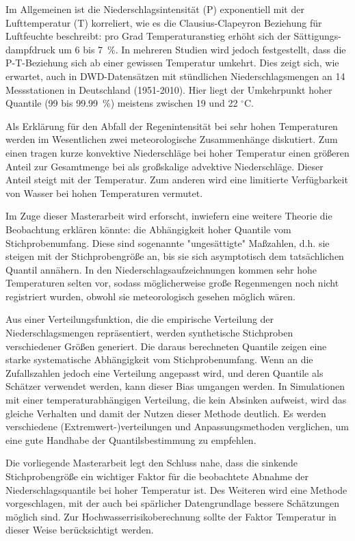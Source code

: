 \documentclass[a4paper]{article}
\begin{document}
\begin{multicols}{2}
Im Allgemeinen ist die Niederschlagsintensität (P) exponentiell mit der Lufttemperatur (T) korreliert, wie es die Clausius-Clapeyron Beziehung für Luftfeuchte beschreibt: pro Grad Temperaturanstieg erhöht sich der Sättigungs-dampfdruck um 6 bis 7~\%.
In mehreren Studien wird jedoch festgestellt, dass die P-T-Beziehung sich ab einer gewissen Temperatur umkehrt.
Dies zeigt sich, wie erwartet, auch in DWD-Datensätzen mit stündlichen Niederschlagsmengen an 14 Messstationen in Deutschland (1951-2010).
Hier liegt der Umkehrpunkt hoher Quantile (99 bis 99.99~\%) meistens zwischen 19 und 22 $^{\circ}$C.

Als Erklärung für den Abfall der Regenintensität bei sehr hohen Temperaturen werden im Wesentlichen zwei meteorologische Zusammenhänge diskutiert.
Zum einen tragen kurze konvektive Niederschläge bei hoher Temperatur einen größeren Anteil zur Gesamtmenge bei als großskalige advektive Niederschläge.
Dieser Anteil steigt mit der Temperatur.
Zum anderen wird eine limitierte Verfügbarkeit von Wasser bei hohen Temperaturen vermutet.

Im Zuge dieser Masterarbeit wird erforscht, inwiefern eine weitere Theorie die Beobachtung erklären könnte: die Abhängigkeit hoher Quantile vom Stichprobenumfang.
Diese sind sogenannte "ungesättigte" Maßzahlen, d.h. sie steigen mit der Stichprobengröße an, bis sie sich asymptotisch dem tatsächlichen Quantil annähern.
In den Niederschlagsaufzeichnungen kommen sehr hohe Temperaturen selten vor, sodass möglicherweise große Regenmengen noch nicht registriert wurden, obwohl sie meteorologisch gesehen möglich wären.

Aus einer Verteilungsfunktion, die die empirische Verteilung der Niederschlagsmengen repräsentiert, werden synthetische Stichproben verschiedener Größen generiert.
Die daraus berechneten Quantile zeigen eine starke systematische Abhängigkeit vom Stichprobenumfang.
Wenn an die Zufallszahlen jedoch eine Verteilung angepasst wird, und deren Quantile als Schätzer verwendet werden, kann dieser Bias umgangen werden.
In Simulationen mit einer temperaturabhängigen Verteilung, die kein Absinken aufweist, wird das gleiche Verhalten und damit der Nutzen dieser Methode deutlich.
Es werden verschiedene (Extremwert-)verteilungen und Anpassungsmethoden verglichen, um eine gute Handhabe der Quantilsbestimmung zu empfehlen.

Die vorliegende Masterarbeit legt den Schluss nahe, dass die sinkende Stichprobengröße ein wichtiger Faktor für die beobachtete Abnahme der Niederschlagsquantile bei hoher Temperatur ist.
Des Weiteren wird eine Methode vorgeschlagen, mit der auch bei spärlicher Datengrundlage bessere Schätzungen möglich sind.
Zur Hochwasserrisikoberechnung sollte der Faktor Temperatur in dieser Weise berücksichtigt werden.
\end{multicols}
\end{document}
